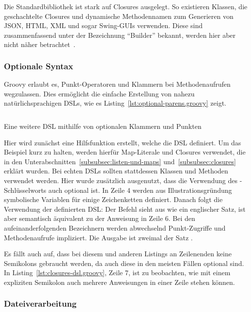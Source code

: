 \documentclass[a4paper]{article}
\newcommand{\codelisting}[3]{\begin{listing}[htp]
	\inputminted{#1}{#1/#2}
	\vspace{-3ex}
	\caption{#3}
	\label{lst:#2}
\end{listing}}
\begin{document}
Die Standardbibliothek ist stark auf Closures ausgelegt.
So existieren Klassen, die geschachtelte Closures und dynamische Methodennamen zum Generieren von JSON, HTML, XML und sogar Swing-GUIs verwenden.
Diese sind zusammenfassend unter der Bezeichnung ``Builder'' bekannt, werden hier aber nicht näher betrachtet~\cite[Abs.~3.15.8]{groovy-lang:documentation}.

\subsubsection{Optionale Syntax}\label{subsubsec:optionale-syntax}

Groovy erlaubt es, Punkt-Operatoren und Klammern bei Methodenaufrufen wegzulassen.
Dies ermöglicht die einfache Erstellung von nahezu natürlichsprachigen DSLs, wie es Listing~\ref{lst:optional-parens.groovy} zeigt.

\codelisting{groovy}{optional-parens.groovy}{Eine weitere DSL mithilfe von optionalen Klammern und Punkten}

Hier wird zunächst eine Hilfsfunktion  erstellt, welche die DSL definiert.
Um das Beispiel kurz zu halten, werden hierfür Map-Literale und Closures verwendet, die in den Unterabschnitten~\ref{subsubsec:listen-und-maps} und~\ref{subsubsec:closures} erklärt wurden.
Bei echten DSLs sollten stattdessen Klassen und Methoden verwendet werden.
Hier wurde zusätzlich ausgenutzt, dass die Verwendung des -Schlüsselworts auch optional ist.
In Zeile 4 werden aus Illustrationsgründung symbolische Variablen für einige Zeichenketten definiert.
Danach folgt die Verwendung der definierten DSL:
Der Befehl sieht aus wie ein englischer Satz, ist aber semantisch äquivalent zu der Anweisung in Zeile 6.
Bei den aufeinanderfolgenden Bezeichnern werden abwechselnd Punkt-Zugriffe und Methodenaufrufe impliziert.
Die Ausgabe ist zweimal der Satz .

Es fällt auch auf, dass bei diesem und anderen Listings an Zeilenenden keine Semikolons gebraucht werden, da auch diese in den meisten Fällen optional sind.
In Listing~\ref{lst:closures-dsl.groovy}, Zeile 7, ist zu beobachten, wie mit einem expliziten Semikolon auch mehrere Anweisungen in einer Zeile stehen können.

\subsubsection{Dateiverarbeitung}
\end{document}
